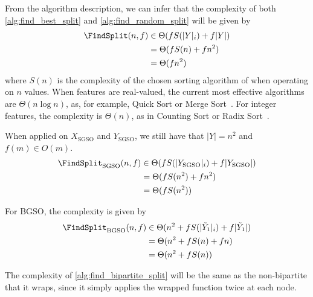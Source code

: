 From the algorithm description, we can infer that the complexity of both \autoref{alg:find_best_split} and \autoref{alg:find_random_split} will be given by
%
\begin{align}
    \FindSplit(n, f)
    &\in \Theta(f S(|Y|_i) + f|Y|)
    \nonumber\\
    &= \Theta(f S(n) + f n^2)
    \nonumber\\
    &= \Theta(f n^2)
    \label{eq:O_find_best_split}
\end{align}
where $S(n)$ is the complexity of the chosen sorting algorithm of \atoref{} when operating on $n$ values.
%
When features are real-valued, the current most effective algorithms are $\Theta(n \log n)$, as, for example, Quick Sort or Merge Sort~\cite{cormen2022introduction}.
For integer features, the complexity is $\Theta(n)$, as in Counting Sort or Radix Sort~\cite{cormen2022introduction}.  %

When applied on $X_\text{SGSO}$ and $Y_\text{SGSO}$, we still have that $|Y| = n^2$ 
and $f(m) \in O(m)$.
%
\begin{align}
    \FindSplit_\text{SGSO}(n, f)
    &\in \Theta(f S(|Y_\text{SGSO}|_i) + f|Y_\text{SGSO}|)
    \nonumber\\ 
    &= \Theta(f S(n^2) + f n^2)
    \nonumber\\ 
    &= \Theta(f S(n^2))
    \label{eq:O_sgso}
\end{align}

For BGSO, the complexity is given by
%
\begin{align}
    \FindSplit_\text{BGSO}(n, f)
    &\in \Theta(n^2 + f S(|\tilde Y_1|_i) + f|\tilde Y_1|)
    \nonumber\\ 
    &= \Theta(n^2 + f S(n) + f n)
    \nonumber\\ 
    &= \Theta(n^2 + f S(n))
    \label{eq:O_bgso}
\end{align}

The complexity of \ref{alg:find_bipartite_split} will be the same as the non-bipartite \FindSplit that it wraps, since it simply applies the wrapped function twice at each node.

